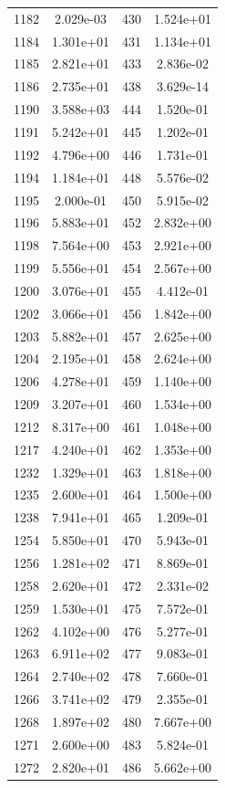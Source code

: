 \documentclass[12pt]{article}
\begin{document}
\begin{longtable}{@{}cccc@{}}
1182 & 2.029e-03 & 430 & 1.524e+01 \\
1184 & 1.301e+01 & 431 & 1.134e+01 \\
1185 & 2.821e+01 & 433 & 2.836e-02 \\
1186 & 2.735e+01 & 438 & 3.629e-14 \\
1190 & 3.588e+03 & 444 & 1.520e-01 \\
1191 & 5.242e+01 & 445 & 1.202e-01 \\
1192 & 4.796e+00 & 446 & 1.731e-01 \\
1194 & 1.184e+01 & 448 & 5.576e-02 \\
1195 & 2.000e-01 & 450 & 5.915e-02 \\
1196 & 5.883e+01 & 452 & 2.832e+00 \\
1198 & 7.564e+00 & 453 & 2.921e+00 \\
1199 & 5.556e+01 & 454 & 2.567e+00 \\
1200 & 3.076e+01 & 455 & 4.412e-01 \\
1202 & 3.066e+01 & 456 & 1.842e+00 \\
1203 & 5.882e+01 & 457 & 2.625e+00 \\
1204 & 2.195e+01 & 458 & 2.624e+00 \\
1206 & 4.278e+01 & 459 & 1.140e+00 \\
1209 & 3.207e+01 & 460 & 1.534e+00 \\
1212 & 8.317e+00 & 461 & 1.048e+00 \\
1217 & 4.240e+01 & 462 & 1.353e+00 \\
1232 & 1.329e+01 & 463 & 1.818e+00 \\
1235 & 2.600e+01 & 464 & 1.500e+00 \\
1238 & 7.941e+01 & 465 & 1.209e-01 \\
1254 & 5.850e+01 & 470 & 5.943e-01 \\
1256 & 1.281e+02 & 471 & 8.869e-01 \\
1258 & 2.620e+01 & 472 & 2.331e-02 \\
1259 & 1.530e+01 & 475 & 7.572e-01 \\
1262 & 4.102e+00 & 476 & 5.277e-01 \\
1263 & 6.911e+02 & 477 & 9.083e-01 \\
1264 & 2.740e+02 & 478 & 7.660e-01 \\
1266 & 3.741e+02 & 479 & 2.355e-01 \\
1268 & 1.897e+02 & 480 & 7.667e+00 \\
1271 & 2.600e+00 & 483 & 5.824e-01 \\
1272 & 2.820e+01 & 486 & 5.662e+00 \\

\end{longtable}
\end{document}
